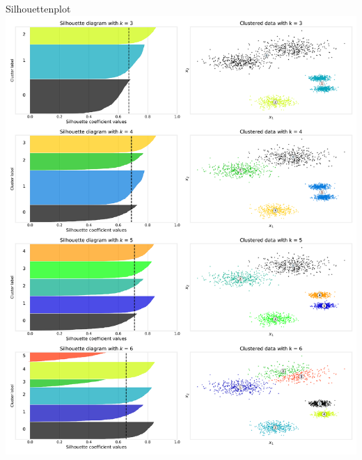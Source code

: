 \begin{example}{Silhouettenplot}
    \centering
    \includegraphics[width=\textwidth]{includes/figures/example_silhouette_plot.png}
\end{example}

